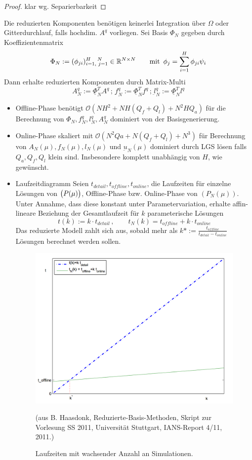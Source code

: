 \begin{proof}
	klar wg. Separierbarkeit
\end{proof}

\begin{bem}
	Die reduzierten Komponenten benötigen keinerlei Integration über $\Omega$ oder Gitterdurchlauf, falls hochdim. $A^q$ vorliegen.
	Sei Basis $\Phi_N$ gegeben durch Koeffizientenmatrix
	\[
		\Phi_N := (\phi_{ji})_{i = 1, \,\, j = 1}^{H \,\,\,\,\,\,\, N} \in \R^{N \times N} \qquad \text{mit \,} \phi_{j} = \sum_{i=1}^{H} \phi_{ji} \psi_i
	\]
	Dann erhalte reduzierten Komponenten durch Matrix-Multi
	\[
		A_N^q := \underline{\Phi}_N^T A^q \, ; \, \underbar f_N^q := \underline{\Phi}_N^T \underbar f^q \, ; \, \underbar l_N^q := \underline{\Phi}_N^T l^q
	\]
\end{bem}

\begin{bem} \beginwithlistbem
	\begin{itemize}
		\item Offline-Phase benötigt $\mathcal{O}(NH^2 + NH(Q_f + Q_l) + N^2HQ_a)$ für die Berechnung von $\Phi_N, f_N^q, l_N^q, A_N^q$ dominiert von der Basisgenerierung.
		\item Online-Phase skaliert mit $\mathcal{O}(N^2Qa + N(Q_f + Q_l) + N^3)$ für Berechnung von $A_N(\mu), f_N(\mu), l_N(\mu)$ und $\underbar u_N(\mu)$ dominiert durch LGS lösen falls $Q_a, Q_f, Q_l$ klein sind. Insbesondere komplett unabhängig von $H$, wie gewünscht.
		\item Laufzeitdiagramm
		Seien $t_{detail}, t_{offline}, t_{online}$, die Laufzeiten für einzelne Lösungen von $\big(P(\mu)\big)$, Offline-Phase bzw. Online-Phase von $(P_N(\mu))$. Unter Annahme, dass diese konstant unter Parametervariation, erhalte affin-lineare Beziehung der Gesamtlaufzeit für $k$ parameterische Lösungen
		\[
			t(k) := k \cdot t_{detail} \, , \qquad t_N(k) = t_{offline} + k \cdot t_{online}
		\]
		Das reduzierte Modell zahlt sich aus, sobald mehr als $k* := \frac{t_{offline}}{t_{detail} - t_{online}}$ Lösungen berechnet werden sollen.
		\begin{figure}[H]
		\centering\small
		\includegraphics[width = 0.5 \textwidth]{Bilder/Laufzeiten.png}
		\caption{Laufzeiten mit wachsender Anzahl an Simulationen.}{(aus B. Haasdonk, Reduzierte-Basis-Methoden, Skript zur Vorlesung SS 2011, Universität Stuttgart, IANS-Report 4/11, 2011.)}
		\label{fig:Laufzeiten}
	\end{figure}
	\end{itemize}
\end{bem}

